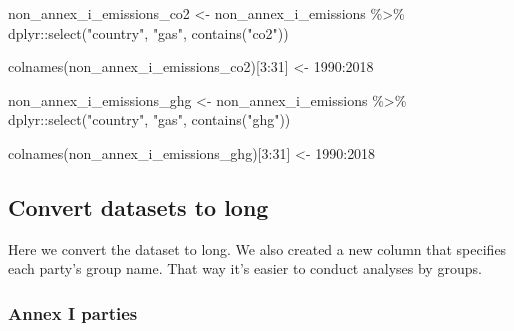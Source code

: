 \documentclass[
  12pt,
]{article}
\newenvironment{Shaded}{}{}
\newcommand{\DecValTok}[1]{\textcolor[rgb]{0.25,0.63,0.44}{#1}}
\newcommand{\FunctionTok}[1]{\textcolor[rgb]{0.02,0.16,0.49}{#1}}
\newcommand{\NormalTok}[1]{#1}
\newcommand{\OtherTok}[1]{\textcolor[rgb]{0.00,0.44,0.13}{#1}}
\newcommand{\SpecialCharTok}[1]{\textcolor[rgb]{0.25,0.44,0.63}{#1}}
\newcommand{\StringTok}[1]{\textcolor[rgb]{0.25,0.44,0.63}{#1}}
\begin{document}
\begin{Shaded}
\begin{Highlighting}[]
\NormalTok{non\_annex\_i\_emissions\_co2 }\OtherTok{\textless{}{-}}\NormalTok{ non\_annex\_i\_emissions }\SpecialCharTok{\%\textgreater{}\%}
\NormalTok{    dplyr}\SpecialCharTok{::}\FunctionTok{select}\NormalTok{(}\StringTok{"country"}\NormalTok{, }\StringTok{"gas"}\NormalTok{, }\FunctionTok{contains}\NormalTok{(}\StringTok{"co2"}\NormalTok{))}

\FunctionTok{colnames}\NormalTok{(non\_annex\_i\_emissions\_co2)[}\DecValTok{3}\SpecialCharTok{:}\DecValTok{31}\NormalTok{] }\OtherTok{\textless{}{-}} \DecValTok{1990}\SpecialCharTok{:}\DecValTok{2018}

\NormalTok{non\_annex\_i\_emissions\_ghg }\OtherTok{\textless{}{-}}\NormalTok{ non\_annex\_i\_emissions }\SpecialCharTok{\%\textgreater{}\%}
\NormalTok{    dplyr}\SpecialCharTok{::}\FunctionTok{select}\NormalTok{(}\StringTok{"country"}\NormalTok{, }\StringTok{"gas"}\NormalTok{, }\FunctionTok{contains}\NormalTok{(}\StringTok{"ghg"}\NormalTok{))}

\FunctionTok{colnames}\NormalTok{(non\_annex\_i\_emissions\_ghg)[}\DecValTok{3}\SpecialCharTok{:}\DecValTok{31}\NormalTok{] }\OtherTok{\textless{}{-}} \DecValTok{1990}\SpecialCharTok{:}\DecValTok{2018}
\end{Highlighting}
\end{Shaded}

\hypertarget{convert-datasets-to-long}{%
\subsection{Convert datasets to long}\label{convert-datasets-to-long}}

Here we convert the dataset to long. We also created a new column that
specifies each party's group name. That way it's easier to conduct
analyses by groups.

\hypertarget{annex-i-parties-3}{%
\subsubsection{Annex I parties}\label{annex-i-parties-3}}
\end{document}
